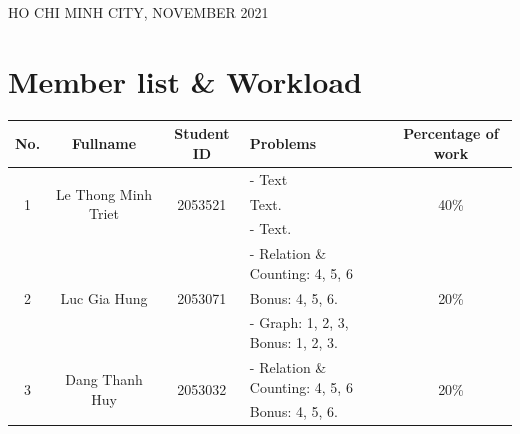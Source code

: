 \documentclass[a4paper]{article}
\begin{document}
\begin{titlepage}
	\begin{center}
		{\footnotesize HO CHI MINH CITY, NOVEMBER 2021}
	\end{center}
\end{titlepage}



\newpage
\tableofcontents
\newpage


\section{Member list \& Workload}

\begin{center}
	\begin{tabular}{|c|c|c|l|c|}
		\hline
		\textbf{No.}       & \textbf{Fullname}                    & \textbf{Student ID}      & \textbf{Problems}                 & \textbf{Percentage of work} \\
		\hline
		\multirow{3}{*}{1} & \multirow{3}{*}{Le Thong Minh Triet} & \multirow{3}{*}{2053521} & - Text                            & \multirow{3}{*}{40\%}       \\
		                   &                                      &                          & Text.                             &                             \\
		                   &                                      &                          & - Text.                           &                             \\
		\hline
		\multirow{3}{*}{2} & \multirow{3}{*}{Luc Gia Hung}        & \multirow{3}{*}{2053071} & - Relation \& Counting: 4, 5, 6   & \multirow{3}{*}{20\%}       \\
		                   &                                      &                          & Bonus: 4, 5, 6.                   &                             \\
		                   &                                      &                          & - Graph: 1, 2, 3, Bonus: 1, 2, 3. &                             \\
		\hline
		\multirow{3}{*}{3} & \multirow{3}{*}{Dang Thanh Huy}      & \multirow{3}{*}{2053032} & - Relation \& Counting: 4, 5, 6   & \multirow{3}{*}{20\%}       \\
		                   &                                      &                          & Bonus: 4, 5, 6.                   &                             \\

\end{tabular}
\end{center}
\end{document}
